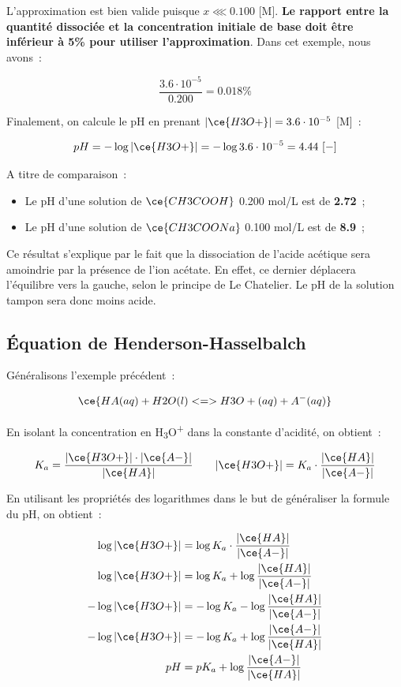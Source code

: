 \documentclass[
  11pt,
  a4paper,
  openany]{book}
\providecommand{\tightlist}{%
  \setlength{\itemsep}{0pt}\setlength{\parskip}{0pt}}
\begin{document}
L'approximation est bien valide puisque \(x \lll 0.100\) {[}M{]}. \textbf{Le rapport entre la quantité dissociée et la concentration initiale de base doit être inférieur à 5\% pour utiliser l'approximation}. Dans cet exemple, nous avons~:

\[
\frac{3.6 \cdot 10^{-5}}{0.200} = 0.018\%
\]

Finalement, on calcule le pH en prenant \(|\ce{H3O+}| = 3.6 \cdot 10^{-5}\) {[}M{]}~:

\[
pH = - \log |\ce{H3O+}| = - \log 3.6 \cdot 10^{-5} = 4.44\ [-]
\]

A titre de comparaison~:

\begin{itemize}
\tightlist
\item
  Le pH d'une solution de \(\ce{CH3COOH}\) 0.200 mol/L est de \textbf{2.72}~;
\item
  Le pH d'une solution de \(\ce{CH3COONa}\) 0.100 mol/L est de \textbf{8.9}~;
\end{itemize}

Ce résultat s'explique par le fait que la dissociation de l'acide acétique sera amoindrie par la présence de l'ion acétate. En effet, ce dernier déplacera l'équilibre vers la gauche, selon le principe de Le Chatelier. Le pH de la solution tampon sera donc moins acide.

\subsection{Équation de Henderson-Hasselbalch}\label{uxe9quation-de-henderson-hasselbalch}

Généralisons l'exemple précédent~:

\[
\ce{HA(aq) + H2O(l) <=> H3O+(aq) + A^{-}(aq)}
\]

En isolant la concentration en H\textsubscript{3}O\textsuperscript{+} dans la constante d'acidité, on obtient~:

\[
\begin{split}
K_a = \frac{|\ce{H3O+}| \cdot |\ce{A-}|}{|\ce{HA}|}
\end{split}
\qquad
\begin{split}
|\ce{H3O+}| = K_a \cdot \frac{|\ce{HA}|}{|\ce{A-}|}
\end{split}
\]

En utilisant les propriétés des logarithmes dans le but de généraliser la formule du pH, on obtient~:

\[
\begin{split}
\log |\ce{H3O+}| &= \log K_a \cdot \frac{|\ce{HA}|}{|\ce{A-}|} \\
\log |\ce{H3O+}| &= \log K_a + \log \frac{|\ce{HA}|}{|\ce{A-}|} \\
- \log |\ce{H3O+}| &= - \log K_a - \log \frac{|\ce{HA}|}{|\ce{A-}|} \\
- \log |\ce{H3O+}| &= - \log K_a + \log \frac{|\ce{A-}|}{|\ce{HA}|} \\
pH &= pK_a + \log \frac{|\ce{A-}|}{|\ce{HA}|}
\end{split}
\]
\end{document}
